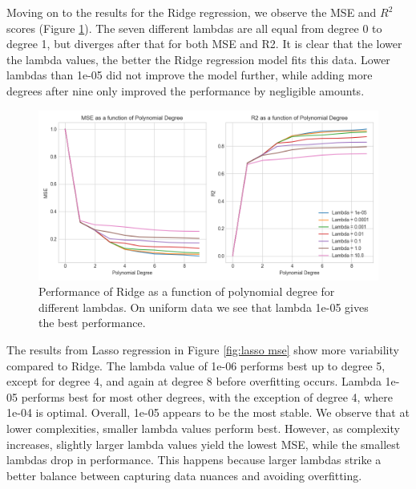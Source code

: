 Moving on to the results for the Ridge regression, we observe the MSE and $R^{2}$ scores (Figure \ref{fig:ridge mse}). The seven different lambdas are all equal from degree 0 to degree 1, but diverges after that for both MSE and R2. It is clear that the lower the lambda values, the better the Ridge regression model fits this data. Lower lambdas than 1e-05 did not improve the model further, while adding more degrees after nine only improved the performance by negligible amounts. 

\begin{figure}[H]
     \includegraphics[width=15cm]{Images/ridge_error_degree.png}
     \caption{Performance of Ridge as a function of polynomial degree for different lambdas. On uniform data we see that lambda 1e-05 gives the best performance.}
     \label{fig:ridge mse}
\end{figure}

The results from Lasso regression in Figure \ref{fig:lasso mse} show more variability compared to Ridge. The lambda value of 1e-06 performs best up to degree 5, except for degree 4, and again at degree 8 before overfitting occurs. Lambda 1e-05 performs best for most other degrees, with the exception of degree 4, where 1e-04 is optimal. Overall, 1e-05 appears to be the most stable. We observe that at lower complexities, smaller lambda values perform best. However, as complexity increases, slightly larger lambda values yield the lowest MSE, while the smallest lambdas drop in performance. This happens because larger lambdas strike a better balance between capturing data nuances and avoiding overfitting. \cite{openai2023chatgpt}

